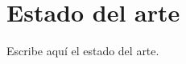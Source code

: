 \documentclass[../main.tex]{subfiles}
\begin{document}
\chapter{Estado del arte}

Escribe aquí el estado del arte.
\end{document}
